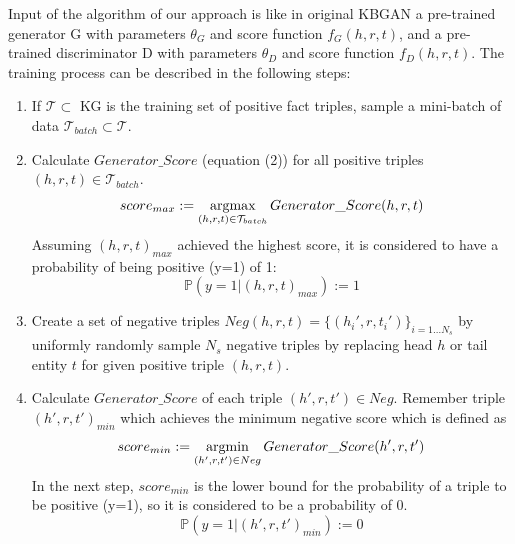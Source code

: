 Input of the algorithm of our approach is like in original \ac{KBGAN} a pre-trained generator G with parameters $\theta_G$ and score function $f_G(h,r,t)$, 
and a pre-trained discriminator D with parameters $\theta_D$ and score function $f_D(h,r,t)$.
The training process can be described in the following steps:
\begin{enumerate}
    \item 
    If $\mathcal{T} \subset $ \ac{KG} is the training set of positive fact triples, sample a mini-batch of data $\mathcal{T}_{batch} \subset \mathcal{T}$.
 
    \item  Calculate $Generator\_Score$ (equation (2)) for all positive triples $(h, r, t) \in \mathcal{T}_{batch}$.
    \begin{equation}
        score_{max} := \operatorname*{argmax}_{(h,r,t) \in \mathcal{T}_{batch}}{Generator\_Score(h,r,t)}
    \end{equation}
    Assuming $(h,r,t)_{max}$ achieved the highest score, 
    it is considered to have a probability of being positive (y=1) of 1:
    \begin{equation}
        \mathds{P}(y = 1|(h, r, t)_{max}) := 1
    \end{equation}
    
    \item 
    Create a set of negative triples $Neg(h,r,t)=\{(h_i',r,t_i')\}_{i=1\dots N_s}$ by uniformly randomly sample $N_s$ negative triples by replacing head $h$ or tail entity $t$ for given positive triple $(h, r, t)$.
    
    \item 
    Calculate $Generator\_Score$ of each triple $(h',r,t') \in Neg$.
    Remember triple $(h',r,t')_{min}$ which achieves the minimum negative score which is defined as
    \begin{equation}
        score_{min} := \operatorname*{argmin}_{(h', r, t') \in Neg}{Generator\_Score(h', r, t')}
    \end{equation}
    In the next step, $score_{min}$ is the lower bound for the probability of a triple to be positive (y=1), so it is considered to be a probability of 0.
    \begin{equation}
        \mathds{P}(y = 1|(h', r, t')_{min}) := 0
    \end{equation}
    

\end{enumerate}
